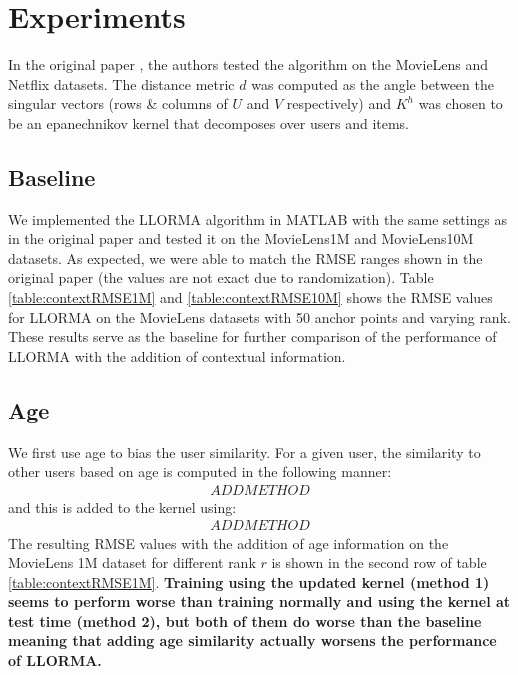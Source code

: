 \documentclass[10 pt,table]{article}  %
\begin{document}
\section{Experiments}
In the original paper \cite{lee2013local}, the authors tested the algorithm on the MovieLens and Netflix datasets. The distance metric $d$ was computed as the angle between the singular vectors (rows \& columns of $U$ and $V$ respectively) and $K^h$ was chosen to be an epanechnikov kernel that decomposes over users and items.
 
\subsection{Baseline}
We implemented the LLORMA algorithm in MATLAB with the same settings as in the original paper and tested it on the MovieLens1M and MovieLens10M datasets. As expected, we were able to match the RMSE ranges shown in the original paper (the values are not exact due to randomization). Table \ref{table:contextRMSE1M} and \ref{table:contextRMSE10M} shows the RMSE values for LLORMA on the MovieLens datasets with 50 anchor points and varying rank. These results serve as the baseline for further comparison of the performance of LLORMA with the addition of contextual information.

\subsection{Age}
We first use age to bias the user similarity. For a given user, the similarity to other users based on age is computed in the following manner:
\begin{align}
ADD METHOD
\end{align} \label{eq:simAge}
and this is added to the kernel using:
\begin{align}
ADD METHOD
\end{align} \label{eq:kernelAge}
The resulting RMSE values with the addition of age information on the MovieLens 1M dataset for different rank $r$ is shown in the second row of table \ref{table:contextRMSE1M}. \textbf{Training using the updated kernel (method 1) seems to perform worse than training normally and using the kernel at test time (method 2), but both of them do worse than the baseline meaning that adding age similarity actually worsens the performance of LLORMA.}
\end{document}
